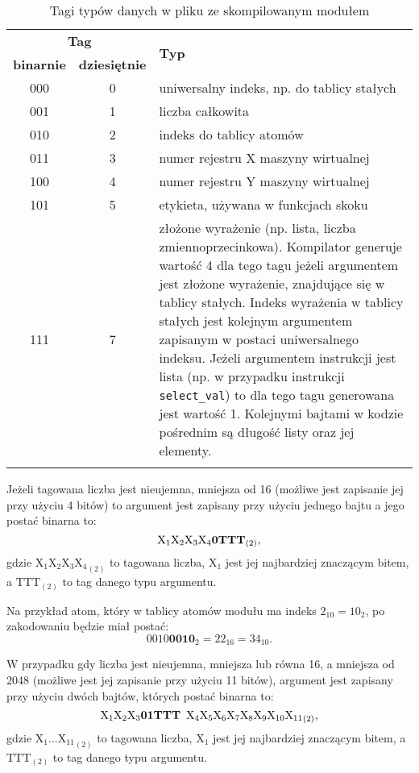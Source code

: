 \begin{longtable}{|c|c|p{9cm}|}
\hline

\multicolumn{2}{|c|}{\textbf{Tag}} & \multirow{2}{*}{\textbf{Typ}} \\
\cline{1-2}
\textbf{binarnie} & \textbf{dziesiętnie} & \\
\hline
\endfirsthead

000 & 0 & uniwersalny indeks, np. do tablicy stałych \\
\hline
001 & 1 & liczba całkowita \\ 
\hline
010 & 2 & indeks do tablicy atomów \\
\hline
011 & 3 & numer rejestru X maszyny wirtualnej \\
\hline
100 & 4 & numer rejestru Y maszyny wirtualnej \\
\hline
101 & 5 & etykieta, używana w funkcjach skoku \\
\hline
111 & 7 & złożone wyrażenie (np. lista, liczba zmiennoprzecinkowa). Kompilator generuje wartość 4 dla tego tagu jeżeli argumentem jest złożone wyrażenie, znajdujące się w tablicy stałych. Indeks wyrażenia w tablicy stałych jest kolejnym argumentem zapisanym w postaci uniwersalnego indeksu. Jeżeli argumentem instrukcji jest lista (np. w przypadku instrukcji \texttt{select\_val}) to dla tego tagu generowana jest wartość 1. Kolejnymi bajtami w kodzie pośrednim są długość listy oraz jej elementy. \\
\hline

\caption{Tagi typów danych w pliku ze skompilowanym modułem} 
\label{table:codeTags} \\
\end{longtable}

Jeżeli tagowana liczba jest nieujemna, mniejsza od 16 (możliwe jest zapisanie jej przy użyciu 4 bitów) to argument jest zapisany przy użyciu jednego bajtu a jego postać binarna to:
$$ \text{X}_1\text{X}_2\text{X}_3\text{X}_4\mathbf{0}\text{\textbf{TTT}}_{(2)}, $$
gdzie ${\text{X}_1\text{X}_2\text{X}_3\text{X}_4}_{(2)}$ to tagowana liczba, $\text{X}_1$ jest jej najbardziej znaczącym bitem, a $\text{TTT}_{(2)}$ to tag danego typu argumentu.

Na przykład atom, który w tablicy atomów modułu ma indeks $2_{10} = 10_{2}$, po zakodowaniu będzie miał postać:
$$0010\mathbf{0010}_{2} = 22_{16} = 34_{10}.$$

W przypadku gdy liczba jest nieujemna, mniejsza lub równa 16, a mniejsza od 2048 (możliwe jest jej zapisanie przy użyciu 11 bitów), argument jest zapisany przy użyciu dwóch bajtów, których postać binarna to:
$$  {\text{X}_1\text{X}_2\text{X}_3\mathbf{01}\text{\textbf{TTT}} \enskip \text{X}_4\text{X}_5\text{X}_6\text{X}_7\text{X}_8\text{X}_9\text{X}_{10}\text{X}_{11}}_{(2)}, $$
gdzie ${\text{X}_1 ... \text{X}_{11}}_{(2)}$ to tagowana liczba, $\text{X}_1$ jest jej najbardziej znaczącym bitem, a ${\text{TTT}}_{(2)}$ to tag danego typu argumentu.

